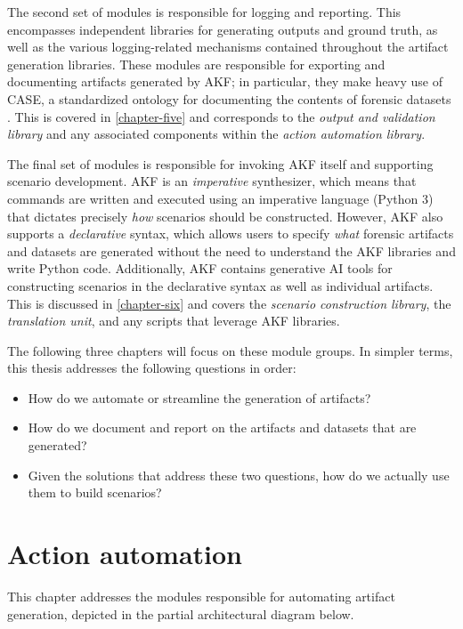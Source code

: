 \documentclass[letterpaper,12pt]{report}
\def\tightlist{}
\begin{document}
The second set of modules is responsible for logging and reporting. This
encompasses independent libraries for generating outputs and ground
truth, as well as the various logging-related mechanisms contained
throughout the artifact generation libraries. These modules are
responsible for exporting and documenting artifacts generated by AKF; in
particular, they make heavy use of CASE, a standardized ontology for
documenting the contents of forensic datasets
\cite{caseyAdvancingCoordinatedCyberinvestigations2017}. This is
covered in \autoref{chapter-five} and corresponds to the
\emph{output and validation library} and any associated components
within the \emph{action automation library}.

The final set of modules is responsible for invoking AKF itself and
supporting scenario development. AKF is an \emph{imperative}
synthesizer, which means that commands are written and executed using an
imperative language (Python 3) that dictates precisely \emph{how}
scenarios should be constructed. However, AKF also supports a
\emph{declarative} syntax, which allows users to specify \emph{what}
forensic artifacts and datasets are generated without the need to
understand the AKF libraries and write Python code. Additionally, AKF
contains generative AI tools for constructing scenarios in the
declarative syntax as well as individual artifacts. This is discussed in
\autoref{chapter-six} and covers the \emph{scenario
construction library}, the \emph{translation unit}, and any scripts that
leverage AKF libraries.

The following three chapters will focus on these module groups. In
simpler terms, this thesis addresses the following questions in order:

\begin{itemize}
\tightlist
\item
  How do we automate or streamline the generation of artifacts?
\item
  How do we document and report on the artifacts and datasets that are
  generated?
\item
  Given the solutions that address these two questions, how do we
  actually use them to build scenarios?
\end{itemize}

\chapter{Action automation}\label{chapter-four}

This chapter addresses the modules responsible for automating artifact
generation, depicted in the partial architectural diagram below.
\end{document}
